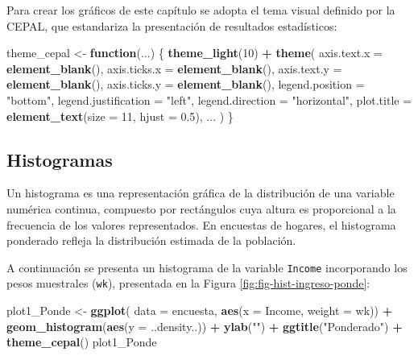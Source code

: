 \documentclass[
  spanish,
  12pt,
]{book}
\newenvironment{Shaded}{\begin{snugshade}}{\end{snugshade}}
\newcommand{\AttributeTok}[1]{\textcolor[rgb]{0.13,0.29,0.53}{#1}}
\newcommand{\ControlFlowTok}[1]{\textcolor[rgb]{0.13,0.29,0.53}{\textbf{#1}}}
\newcommand{\DecValTok}[1]{\textcolor[rgb]{0.00,0.00,0.81}{#1}}
\newcommand{\FloatTok}[1]{\textcolor[rgb]{0.00,0.00,0.81}{#1}}
\newcommand{\FunctionTok}[1]{\textcolor[rgb]{0.13,0.29,0.53}{\textbf{#1}}}
\newcommand{\NormalTok}[1]{#1}
\newcommand{\OtherTok}[1]{\textcolor[rgb]{0.56,0.35,0.01}{#1}}
\newcommand{\SpecialCharTok}[1]{\textcolor[rgb]{0.81,0.36,0.00}{\textbf{#1}}}
\newcommand{\StringTok}[1]{\textcolor[rgb]{0.31,0.60,0.02}{#1}}
\begin{document}
Para crear los gráficos de este capítulo se adopta el tema visual definido por la CEPAL, que estandariza la presentación de resultados estadísticos:

\begin{Shaded}
\begin{Highlighting}[]
\NormalTok{theme\_cepal }\OtherTok{\textless{}{-}} \ControlFlowTok{function}\NormalTok{(...) \{}
  \FunctionTok{theme\_light}\NormalTok{(}\DecValTok{10}\NormalTok{) }\SpecialCharTok{+}
    \FunctionTok{theme}\NormalTok{(}
      \AttributeTok{axis.text.x  =} \FunctionTok{element\_blank}\NormalTok{(),}
      \AttributeTok{axis.ticks.x =} \FunctionTok{element\_blank}\NormalTok{(),}
      \AttributeTok{axis.text.y  =} \FunctionTok{element\_blank}\NormalTok{(),}
      \AttributeTok{axis.ticks.y =} \FunctionTok{element\_blank}\NormalTok{(),}
      \AttributeTok{legend.position  =} \StringTok{"bottom"}\NormalTok{,}
      \AttributeTok{legend.justification =} \StringTok{"left"}\NormalTok{,}
      \AttributeTok{legend.direction =} \StringTok{"horizontal"}\NormalTok{,}
      \AttributeTok{plot.title =} \FunctionTok{element\_text}\NormalTok{(}\AttributeTok{size =} \DecValTok{11}\NormalTok{, }\AttributeTok{hjust =} \FloatTok{0.5}\NormalTok{),}
\NormalTok{      ...}
\NormalTok{    )}
\NormalTok{\}}
\end{Highlighting}
\end{Shaded}

\subsection{Histogramas}\label{histogramas}

Un histograma es una representación gráfica de la distribución de una variable numérica continua, compuesto por rectángulos cuya altura es proporcional a la frecuencia de los valores representados. En encuestas de hogares, el histograma ponderado refleja la distribución estimada de la población.

A continuación se presenta un histograma de la variable \texttt{Income} incorporando los pesos muestrales (\texttt{wk}), presentada en la Figura \ref{fig:fig-hist-ingreso-ponde}:

\begin{Shaded}
\begin{Highlighting}[]
\NormalTok{plot1\_Ponde }\OtherTok{\textless{}{-}} \FunctionTok{ggplot}\NormalTok{(}
  \AttributeTok{data =}\NormalTok{ encuesta,}
  \FunctionTok{aes}\NormalTok{(}\AttributeTok{x =}\NormalTok{ Income, }\AttributeTok{weight =}\NormalTok{ wk)) }\SpecialCharTok{+}
  \FunctionTok{geom\_histogram}\NormalTok{(}\FunctionTok{aes}\NormalTok{(}\AttributeTok{y =}\NormalTok{ ..density..)) }\SpecialCharTok{+}
  \FunctionTok{ylab}\NormalTok{(}\StringTok{""}\NormalTok{) }\SpecialCharTok{+}
  \FunctionTok{ggtitle}\NormalTok{(}\StringTok{"Ponderado"}\NormalTok{) }\SpecialCharTok{+}
  \FunctionTok{theme\_cepal}\NormalTok{()}
\NormalTok{plot1\_Ponde}
\end{Highlighting}
\end{Shaded}
\end{document}

